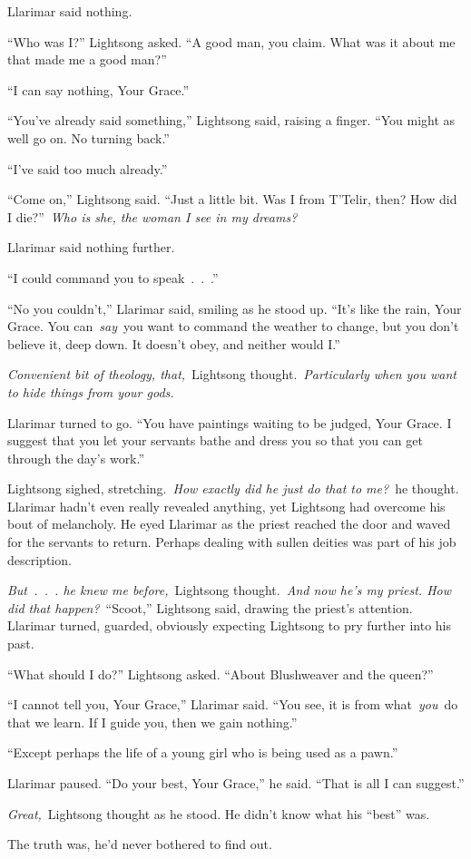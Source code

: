 Llarimar said nothing.

“Who was I?” Lightsong asked. “A good man, you claim. What was it about me that made me a good man?”

“I can say nothing, Your Grace.”

“You’ve already said something,” Lightsong said, raising a finger. “You might as well go on. No turning back.”

“I’ve said too much already.”

“Come on,” Lightsong said. “Just a little bit. Was I from T’Telir, then? How did I die?”~\textit{Who is she, the woman I see in my dreams?}

Llarimar said nothing further.

“I could command you to speak~.~.~.”

“No you couldn’t,” Llarimar said, smiling as he stood up. “It’s like the rain, Your Grace. You can~\textit{say}~you want to command the weather to change, but you don’t believe it, deep down. It doesn’t obey, and neither would I.”

\textit{Convenient bit of theology, that,}~Lightsong thought.~\textit{Particularly when you want to hide things from your gods.}

Llarimar turned to go. “You have paintings waiting to be judged, Your Grace. I suggest that you let your servants bathe and dress you so that you can get through the day’s work.”

Lightsong sighed, stretching.~\textit{How exactly did he just do that to me?}~he thought. Llarimar hadn’t even really revealed anything, yet Lightsong had overcome his bout of melancholy. He eyed Llarimar as the priest reached the door and waved for the servants to return. Perhaps dealing with sullen deities was part of his job description.

\textit{But~.~.~. he knew me before,}~Lightsong thought.~\textit{And now he’s my priest. How did that happen?}~“Scoot,” Lightsong said, drawing the priest’s attention. Llarimar turned, guarded, obviously expecting Lightsong to pry further into his past.

“What should I do?” Lightsong asked. “About Blushweaver and the queen?”

“I cannot tell you, Your Grace,” Llarimar said. “You see, it is from what~\textit{you}~do that we learn. If I guide you, then we gain nothing.”

“Except perhaps the life of a young girl who is being used as a pawn.”

Llarimar paused. “Do your best, Your Grace,” he said. “That is all I can suggest.”

\textit{Great,}~Lightsong thought as he stood. He didn’t know what his “best” was.

The truth was, he’d never bothered to find out.

